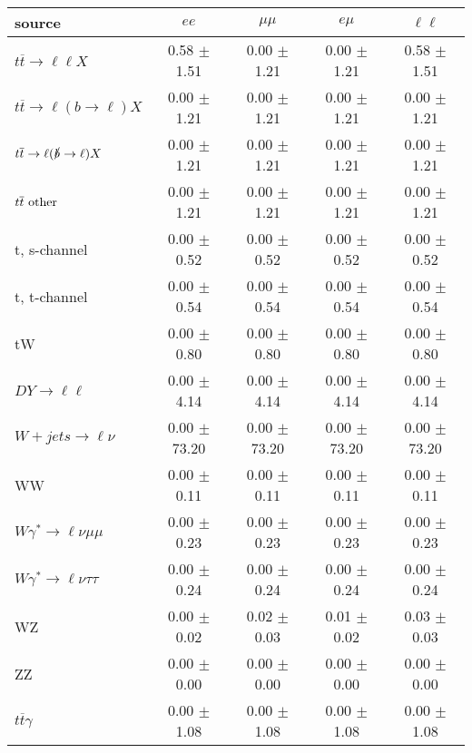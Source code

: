 \begin{tabular}{l|cccc} \hline\hline
source & $ee$ & $\mu\mu$ & $e\mu$ & $\ell\ell $ \\
\hline
$t\overline{t} \rightarrow \ell \ell X$ &  0.58 $\pm$  1.51 &  0.00 $\pm$  1.21 &  0.00 $\pm$  1.21 &  0.58 $\pm$  1.51 \\
$t\overline{t} \rightarrow \ell (b \rightarrow \ell) X$ &  0.00 $\pm$  1.21 &  0.00 $\pm$  1.21 &  0.00 $\pm$  1.21 &  0.00 $\pm$  1.21 \\
$t\overline{t} \rightarrow \ell (\slashed b \rightarrow \ell) X$ &  0.00 $\pm$  1.21 &  0.00 $\pm$  1.21 &  0.00 $\pm$  1.21 &  0.00 $\pm$  1.21 \\
        $t\overline{t}\ \rm{other}$ &  0.00 $\pm$  1.21 &  0.00 $\pm$  1.21 &  0.00 $\pm$  1.21 &  0.00 $\pm$  1.21 \\
\hline
                       t, s-channel &  0.00 $\pm$  0.52 &  0.00 $\pm$  0.52 &  0.00 $\pm$  0.52 &  0.00 $\pm$  0.52 \\
                       t, t-channel &  0.00 $\pm$  0.54 &  0.00 $\pm$  0.54 &  0.00 $\pm$  0.54 &  0.00 $\pm$  0.54 \\
                                 tW &  0.00 $\pm$  0.80 &  0.00 $\pm$  0.80 &  0.00 $\pm$  0.80 &  0.00 $\pm$  0.80 \\
\hline
         $DY \rightarrow \ell \ell$ &  0.00 $\pm$  4.14 &  0.00 $\pm$  4.14 &  0.00 $\pm$  4.14 &  0.00 $\pm$  4.14 \\
      $W+jets \rightarrow \ell \nu$ &  0.00 $\pm$ 73.20 &  0.00 $\pm$ 73.20 &  0.00 $\pm$ 73.20 &  0.00 $\pm$ 73.20 \\
                                 WW &  0.00 $\pm$  0.11 &  0.00 $\pm$  0.11 &  0.00 $\pm$  0.11 &  0.00 $\pm$  0.11 \\
\hline
$W\gamma^{*} \rightarrow \ell \nu \mu\mu$ &  0.00 $\pm$  0.23 &  0.00 $\pm$  0.23 &  0.00 $\pm$  0.23 &  0.00 $\pm$  0.23 \\
$W\gamma^{*} \rightarrow \ell \nu \tau\tau$ &  0.00 $\pm$  0.24 &  0.00 $\pm$  0.24 &  0.00 $\pm$  0.24 &  0.00 $\pm$  0.24 \\
                                 WZ &  0.00 $\pm$  0.02 &  0.02 $\pm$  0.03 &  0.01 $\pm$  0.02 &  0.03 $\pm$  0.03 \\
                                 ZZ &  0.00 $\pm$  0.00 &  0.00 $\pm$  0.00 &  0.00 $\pm$  0.00 &  0.00 $\pm$  0.00 \\
\hline
              $t\overline{t}\gamma$ &  0.00 $\pm$  1.08 &  0.00 $\pm$  1.08 &  0.00 $\pm$  1.08 &  0.00 $\pm$  1.08 \\

\end{tabular}
